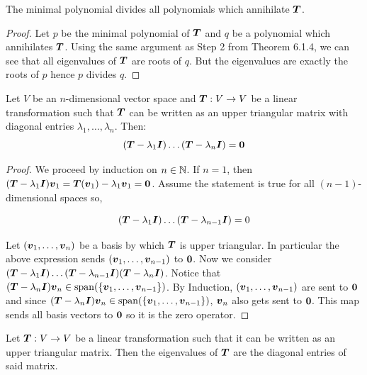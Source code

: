 \begin{corollary}
    The minimal polynomial divides all polynomials which annihilate $\boldsymbol{T}$. 
\end{corollary}

\begin{proof}
    Let $p$ be the minimal polynomial of $\boldsymbol{T}$ and $q$ be a polynomial which annihilates $\boldsymbol{T}$. Using the same argument as Step 2 from Theorem 6.1.4, we can see that all eigenvalues of $\boldsymbol{T}$ are roots of $q$. But the eigenvalues are exactly the roots of $p$ hence $p$ divides $q$.
\end{proof}

\begin{lemma}
    Let $V$ be an $n$-dimensional vector space and $\boldsymbol{T}:V\to V$ be a linear transformation such that $\boldsymbol{T}$ can be written as an upper triangular matrix with diagonal entries $\lambda_1,\dots,\lambda_n$. Then:
    $$(\boldsymbol{T}-\lambda_1 \boldsymbol{I})\dots(\boldsymbol{T}-\lambda_n\boldsymbol{I})=\boldsymbol{0}$$
\end{lemma}

\begin{proof}
    We proceed by induction on $n\in\mathbb{N}$. If $n=1$, then $(\boldsymbol{T}-\lambda_1\boldsymbol{I})\boldsymbol{v}_1=\boldsymbol{T}(\boldsymbol{v}_1)-\lambda_1\boldsymbol{v}_1=\boldsymbol{0}$. Assume the statement is true for all $(n-1)$-dimensional spaces so,
    
    $$(\boldsymbol{T}-\lambda_1 \boldsymbol{I})\dots(\boldsymbol{T}-\lambda_{n-1}\boldsymbol{I})=0$$
    
    Let $(\boldsymbol{v}_1,\dots,\boldsymbol{v}_n)$ be a basis by which $\boldsymbol{T}$ is upper triangular. In particular the above expression sends $(\boldsymbol{v}_1,\dots,\boldsymbol{v}_{n-1})$ to $\boldsymbol{0}$. Now we consider $(\boldsymbol{T}-\lambda_1 \boldsymbol{I})\dots(\boldsymbol{T}-\lambda_{n-1}\boldsymbol{I})(\boldsymbol{T}-\lambda_n\boldsymbol{I})$. Notice that $(\boldsymbol{T}-\lambda_n\boldsymbol{I})\boldsymbol{v}_n\in\operatorname{span}(\{\boldsymbol{v}_1,\dots,\boldsymbol{v}_{n-1}\})$. By Induction, $(\boldsymbol{v}_1,\dots,\boldsymbol{v}_{n-1})$ are sent to $\boldsymbol{0}$ and since $(\boldsymbol{T}-\lambda_n\boldsymbol{I})\boldsymbol{v}_n\in\operatorname{span}(\{\boldsymbol{v}_1,\dots,\boldsymbol{v}_{n-1}\})$, $\boldsymbol{v}_n$ also gets sent to $\boldsymbol{0}$. This map sends all basis vectors to $\boldsymbol{0}$ so it is the zero operator.
\end{proof}

\begin{theorem}
    Let $\boldsymbol{T}:V\to V$ be a linear transformation such that it can be written as an upper triangular matrix. Then the eigenvalues of $\boldsymbol{T}$ are the diagonal entries of said matrix.
\end{theorem}

